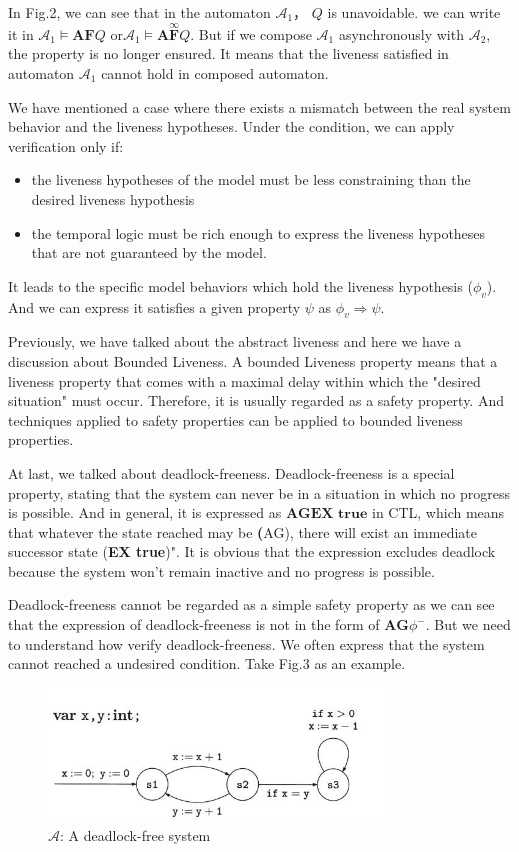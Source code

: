 \documentclass{acmtog} %
\begin{document}
    In Fig.2, we can see that in the automaton $\mathcal{A}_1$， $Q$ is unavoidable. we can write it in $\mathcal{A}_1\models\textbf{AF}Q$ or$\mathcal{A}_1\models\textbf{A}\overset{\infty}{\textbf{F}} Q$. But if we compose $\mathcal{A}_1$ asynchronously with $\mathcal{A}_2$, the property is no longer ensured. It means that the liveness satisfied in automaton $\mathcal{A}_1$ cannot hold in composed automaton.
    
    We have mentioned a case where there exists a mismatch between the real system behavior and the liveness hypotheses. Under the condition, we can apply verification only if:
    \begin{itemize}
      \item the liveness hypotheses of the model must be less constraining than the desired liveness hypothesis
      \item the temporal logic must be rich enough to express the liveness hypotheses that are not guaranteed by the model.
    \end{itemize}
    
    It leads to the specific model behaviors which hold the liveness hypothesis ($\phi_v$). And we can express it satisfies a given property $\psi$ as $\phi_v\Rightarrow\psi$.
    
    Previously, we have talked about the abstract liveness and here we have a discussion about Bounded Liveness. A bounded Liveness property means that a liveness property that comes with a maximal delay within which the "desired situation" must occur. Therefore, it is usually regarded as a safety property. And techniques applied to safety properties can be applied to bounded liveness properties.

    At last, we talked about deadlock-freeness. Deadlock-freeness is a special property, stating that the system can never be in a situation in which no progress is possible. And in general, it is expressed as $\textbf{AGEX true}$ in CTL, which means that whatever the state reached may be \textbf(AG), there will exist an immediate successor state (\textbf{EX true})". It is obvious that the expression excludes deadlock because the system won't remain inactive and no progress is possible.
    
    Deadlock-freeness cannot be regarded as a simple safety property as we can see that the expression of deadlock-freeness is not in the form of $\textbf{AG}\phi^-$. But we need to understand how verify deadlock-freeness. We often express that the system cannot reached a undesired condition. Take Fig.3 as an example.
    \begin{figure}[H]
      \centering
      \includegraphics[width=3.5in]{3.jpg}
      \caption{$\mathcal{A}$: A deadlock-free system}
    \end{figure}
    
\end{document}
